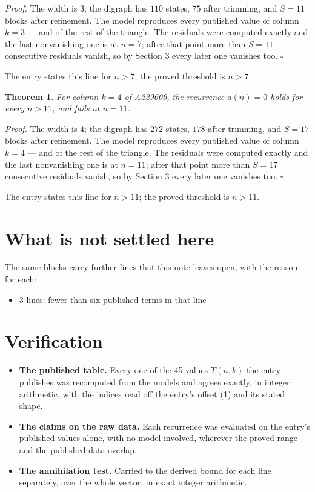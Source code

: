 \documentclass[11pt]{article}
\newtheorem{theorem}{Theorem}
\theoremstyle{definition}
\begin{document}
{\itshape Proof.} The width is $3$; the digraph has $110$ states, $75$ after trimming, and $S = 11$ blocks after refinement. The model reproduces every published value of column $k = 3$ --- and of the rest of the triangle. The residuals were computed exactly and the last nonvanishing one is at $n = 7$; after that point more than $S = 11$ consecutive residuals vanish, so by Section 3 every later one vanishes too. $\square$

The entry states this line for $n > 7$; the proved threshold is $n > 7$.

\begin{theorem} For column $k = 4$ of A229606, the recurrence $a(n) = 0$ holds for every $n > 11$, and fails at $n = 11$.\end{theorem}

{\itshape Proof.} The width is $4$; the digraph has $272$ states, $178$ after trimming, and $S = 17$ blocks after refinement. The model reproduces every published value of column $k = 4$ --- and of the rest of the triangle. The residuals were computed exactly and the last nonvanishing one is at $n = 11$; after that point more than $S = 17$ consecutive residuals vanish, so by Section 3 every later one vanishes too. $\square$

The entry states this line for $n > 11$; the proved threshold is $n > 11$.

\section{What is not settled here}

The same blocks carry further lines that this note leaves open, with the reason for each:

\begin{itemize}

\item 3 lines: fewer than six published terms in that line

\end{itemize}

\section{Verification}

\begin{itemize}

\item {\bfseries The published table.} Every one of the 45 values $T(n,k)$ the entry publishes was recomputed from the models and agrees exactly, in integer arithmetic, with the indices read off the entry's offset (1) and its stated shape.

\item {\bfseries The claims on the raw data.} Each recurrence was evaluated on the entry's published values alone, with no model involved, wherever the proved range and the published data overlap.

\item {\bfseries The annihilation test.} Carried to the derived bound for each line separately, over the whole vector, in exact integer arithmetic.

\end{itemize}
\end{document}
